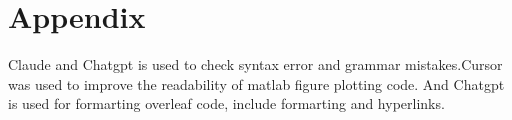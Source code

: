 \documentclass[a4paper,11pt]{article}
\begin{document}
 
 

\vspace{-10pt}


 
\vspace{-10pt}

\section{Appendix}
\vspace{-10pt}
Claude and Chatgpt is used to check syntax error and grammar mistakes.Cursor was used to improve the readability of matlab figure plotting code. And Chatgpt is used for formarting overleaf code, include formarting and hyperlinks.

 
\end{document}
